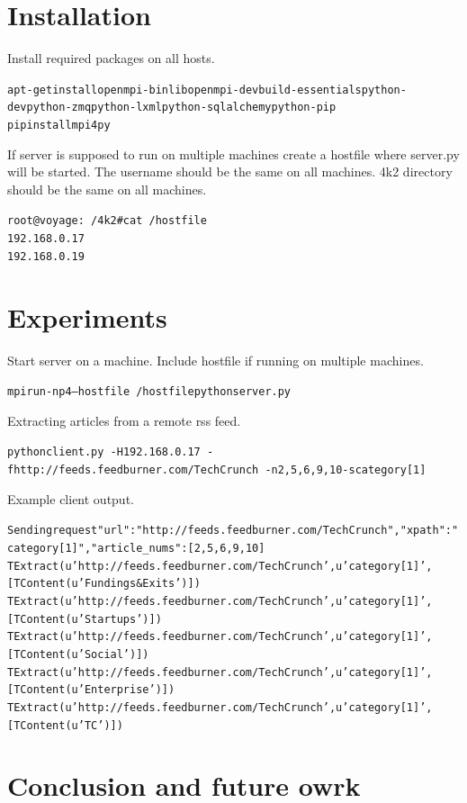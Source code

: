\documentclass[a4paper,12pt]{article}
\begin{document}
\section{Installation}
Install required packages on all hosts.
\begin{alltt}
apt-get install openmpi-bin libopenmpi-dev build-essentials python-dev python-zmq python-lxml python-sqlalchemy python-pip
pip install mpi4py
\end{alltt}

If server is supposed to run on multiple machines create a hostfile where server.py will be started.
The username should be the same on all machines. 4k2 directory should be the same on all machines.
\begin{alltt}
root@voyage:~/4k2# cat ~/hostfile
192.168.0.17
192.168.0.19
\end{alltt}



\section{Experiments}
Start server on a machine. Include hostfile if running on multiple machines.
\begin{alltt}
mpirun -np 4 --hostfile ~/hostfile python server.py
\end{alltt}

Extracting articles from a remote rss feed.
\begin{alltt}
 python client.py \
-H 192.168.0.17 \
-f http://feeds.feedburner.com/TechCrunch \
-n 2,5,6,9,10 -s category[1]
\end{alltt}

Example client output. 
\begin{alltt}
Sending request {"url": "http://feeds.feedburner.com/TechCrunch", "xpath": "category[1]", "article_nums": [2, 5, 6, 9, 10]}
TExtract(u'http://feeds.feedburner.com/TechCrunch', u'category[1]', [TContent(u'Fundings & Exits')])
TExtract(u'http://feeds.feedburner.com/TechCrunch', u'category[1]', [TContent(u'Startups')])
TExtract(u'http://feeds.feedburner.com/TechCrunch', u'category[1]', [TContent(u'Social')])
TExtract(u'http://feeds.feedburner.com/TechCrunch', u'category[1]', [TContent(u'Enterprise')])
TExtract(u'http://feeds.feedburner.com/TechCrunch', u'category[1]', [TContent(u'TC')])
\end{alltt}



\section{Conclusion and future owrk}
\end{document}
